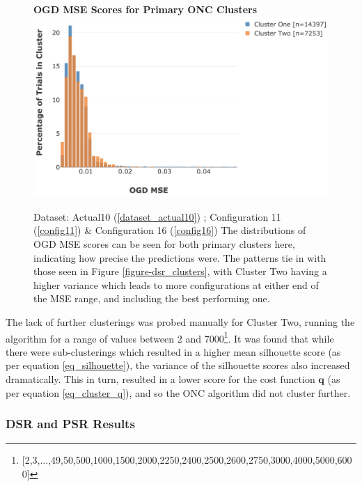 \documentclass[a4paper,11pt,oneside]{article}
\theoremstyle{plain}
\theoremstyle{definition}
\begin{document}
	\begin{figure}[H]
		\centering
		\textbf{OGD MSE Scores for Primary ONC Clusters}
		\includegraphics[scale=0.45]{images/results/8_10_dsr/cluster_distributions_mse.png} 
		\caption[OGD MSE Scores for Primary ONC Clusters]{Dataset: Actual10 (\ref{dataset_actual10}) ; Configuration 11 (\ref{config11}) \&  Configuration 16 (\ref{config16})
			\newline The distributions of OGD MSE scores can be seen for both primary clusters here, indicating how precise the predictions were. The patterns tie in with those seen in Figure \ref{figure-dsr_clusters}, with Cluster Two having a higher variance which leads to more configurations at either end of the MSE range, and including the best performing one.}
		\label{figure-dsr_clusters_mse}
	\end{figure}
	
	The lack of further clusterings was probed manually for Cluster Two, running the algorithm for a range of values between 2 and 7000\footnote{[2,3,...,49,50,500,1000,1500,2000,2250,2400,2500,2600,2750,3000,4000,5000,6000]}. It was found that while there were sub-clusterings which resulted in a higher mean silhouette score (as per equation \eqref{eq_silhouette}), the variance of the silhouette scores also increased dramatically. This in turn, resulted in a lower score for the cost function $\mathbf{q}$ (as per equation \eqref{eq_cluster_q}), and so the ONC algorithm did not cluster further.
	
	\subsubsection{DSR and PSR Results}\label{results_dsr2}
	
\end{document}
